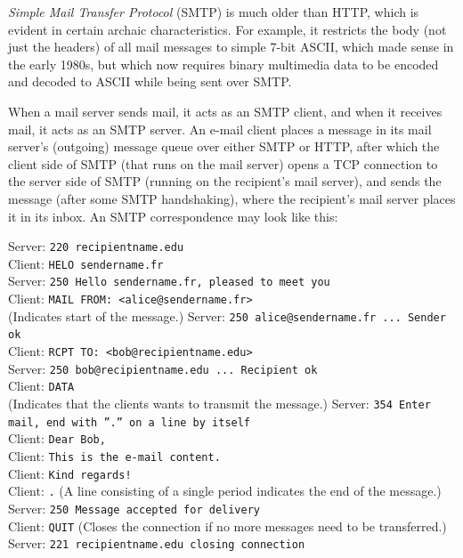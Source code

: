 \documentclass[table, xcdraw]{article}%
\begin{document}
\emph{Simple Mail Transfer Protocol} (SMTP) is much older than HTTP, which is evident in certain archaic characteristics. For example, it
restricts the body (not just the headers) of all mail messages to simple 7-bit ASCII, which made sense in the early 1980s, but which now requires
binary multimedia data to be encoded and decoded to ASCII while being sent over SMTP.

When a mail server sends mail, it acts as an SMTP client, and when it receives mail, it acts as an SMTP server. An e-mail client places a message in its mail server's (outgoing) message queue over either SMTP or HTTP, after which the client side of SMTP (that runs on the mail server) opens a TCP connection to the server side of SMTP (running on the recipient's mail server), and sends the message (after some SMTP handshaking), where the recipient's mail server places it in its inbox. An SMTP correspondence may look like this:

Server: \texttt{220 recipientname.edu}\\
Client: \texttt{HELO sendername.fr}\\
Server: \texttt{250 Hello sendername.fr, pleased to meet you}\\
Client: \texttt{MAIL FROM: <alice@sendername.fr>}\\ (Indicates start of the message.)
Server: \texttt{250 alice@sendername.fr ... Sender ok}\\
Client: \texttt{RCPT TO: <bob@recipientname.edu>}\\
Server: \texttt{250 bob@recipientname.edu ... Recipient ok}\\
Client: \texttt{DATA}\\ (Indicates that the clients wants to transmit the message.)
Server: \texttt{354 Enter mail, end with ”.” on a line by itself}\\
Client: \texttt{Dear Bob,}\\
Client: \texttt{This is the e-mail content.}\\
Client: \texttt{Kind regards!}\\
Client: \texttt{.} (A line consisting of a single period indicates the end of the message.)\\
Server: \texttt{250 Message accepted for delivery}\\
Client: \texttt{QUIT} (Closes the connection if no more messages need to be transferred.)\\
Server: \texttt{221 recipientname.edu closing connection}
\end{document}

